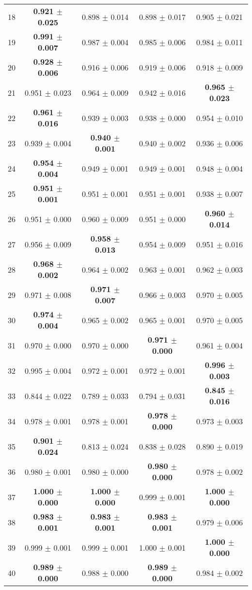 \begin{table}[!ht]
{\begin{tabular}{r c c c c}
18 & \textbf{0.921 $\pm$ 0.025} & 0.898 $\pm$ 0.014 & 0.898 $\pm$ 0.017 & 0.905 $\pm$ 0.021 \\
19 & \textbf{0.991 $\pm$ 0.007} & 0.987 $\pm$ 0.004 & 0.985 $\pm$ 0.006 & 0.984 $\pm$ 0.011 \\
20 & \textbf{0.928 $\pm$ 0.006} & 0.916 $\pm$ 0.006 & 0.919 $\pm$ 0.006 & 0.918 $\pm$ 0.009 \\
21 & 0.951 $\pm$ 0.023 & 0.964 $\pm$ 0.009 & 0.942 $\pm$ 0.016 & \textbf{0.965 $\pm$ 0.023} \\
22 & \textbf{0.961 $\pm$ 0.016} & 0.939 $\pm$ 0.003 & 0.938 $\pm$ 0.000 & 0.954 $\pm$ 0.010 \\
23 & 0.939 $\pm$ 0.004 & \textbf{0.940 $\pm$ 0.001} & 0.940 $\pm$ 0.002 & 0.936 $\pm$ 0.006 \\
24 & \textbf{0.954 $\pm$ 0.004} & 0.949 $\pm$ 0.001 & 0.949 $\pm$ 0.001 & 0.948 $\pm$ 0.004 \\
25 & \textbf{0.951 $\pm$ 0.001} & 0.951 $\pm$ 0.001 & 0.951 $\pm$ 0.001 & 0.938 $\pm$ 0.007 \\
26 & 0.951 $\pm$ 0.000 & 0.960 $\pm$ 0.009 & 0.951 $\pm$ 0.000 & \textbf{0.960 $\pm$ 0.014} \\
27 & 0.956 $\pm$ 0.009 & \textbf{0.958 $\pm$ 0.013} & 0.954 $\pm$ 0.009 & 0.951 $\pm$ 0.016 \\
28 & \textbf{0.968 $\pm$ 0.002} & 0.964 $\pm$ 0.002 & 0.963 $\pm$ 0.001 & 0.962 $\pm$ 0.003 \\
29 & 0.971 $\pm$ 0.008 & \textbf{0.971 $\pm$ 0.007} & 0.966 $\pm$ 0.003 & 0.970 $\pm$ 0.005 \\
30 & \textbf{0.974 $\pm$ 0.004} & 0.965 $\pm$ 0.002 & 0.965 $\pm$ 0.001 & 0.970 $\pm$ 0.005 \\
31 & 0.970 $\pm$ 0.000 & 0.970 $\pm$ 0.000 & \textbf{0.971 $\pm$ 0.000} & 0.961 $\pm$ 0.004 \\
32 & 0.995 $\pm$ 0.004 & 0.972 $\pm$ 0.001 & 0.972 $\pm$ 0.001 & \textbf{0.996 $\pm$ 0.003} \\
33 & 0.844 $\pm$ 0.022 & 0.789 $\pm$ 0.033 & 0.794 $\pm$ 0.031 & \textbf{0.845 $\pm$ 0.016} \\
34 & 0.978 $\pm$ 0.001 & 0.978 $\pm$ 0.001 & \textbf{0.978 $\pm$ 0.000} & 0.973 $\pm$ 0.003 \\
35 & \textbf{0.901 $\pm$ 0.024} & 0.813 $\pm$ 0.024 & 0.838 $\pm$ 0.028 & 0.890 $\pm$ 0.019 \\
36 & 0.980 $\pm$ 0.001 & 0.980 $\pm$ 0.000 & \textbf{0.980 $\pm$ 0.000} & 0.978 $\pm$ 0.002 \\
37 & \textbf{1.000 $\pm$ 0.000} & \textbf{1.000 $\pm$ 0.000} & 0.999 $\pm$ 0.001 & \textbf{1.000 $\pm$ 0.000} \\
38 & \textbf{0.983 $\pm$ 0.001} & \textbf{0.983 $\pm$ 0.001} & \textbf{0.983 $\pm$ 0.001} & 0.979 $\pm$ 0.006 \\
39 & 0.999 $\pm$ 0.001 & 0.999 $\pm$ 0.001 & 1.000 $\pm$ 0.001 & \textbf{1.000 $\pm$ 0.000} \\
40 & \textbf{0.989 $\pm$ 0.000} & 0.988 $\pm$ 0.000 & \textbf{0.989 $\pm$ 0.000} & 0.984 $\pm$ 0.002 \\
\end{tabular}}
\end{table}
